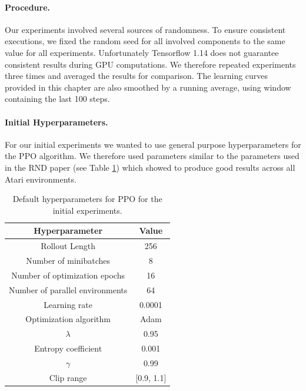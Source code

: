 \paragraph{Procedure.}
Our experiments involved several sources of randomness. To ensure consistent executions, we fixed the random seed for all involved components to the same value for all experiments. Unfortunately Tensorflow 1.14 does not guarantee consistent results during GPU computations. We therefore repeated experiments three times and averaged the results for comparison. The learning curves provided in this chapter are also smoothed by a running average, using window containing the last 100 steps.

\paragraph{Initial Hyperparameters.}
For our initial experiments we wanted to use general purpose hyperparameters for the PPO algorithm. We therefore used parameters similar to the parameters used in the RND paper \cite{burda2018exploration} (see Table \ref{tab:RNDParameters}) which showed to produce good results across all Atari environments. 


\begin{table} [ht]
    \begin{center}
        \begin{tabular}{|c|c|}
            \hline
            Hyperparameter & Value \\
            \hline
            Rollout Length & 256 \\
            Number of minibatches & 8 \\
            Number of optimization epochs & 16 \\
            Number of parallel environments & 64 \\
            Learning rate & 0.0001 \\
            Optimization algorithm & Adam \cite{kingma2014adam} \\
            $\lambda$ & 0.95 \\
            Entropy coefficient & 0.001 \\
            $\gamma$ & 0.99 \\
            Clip range & [0.9, 1.1] \\
            \hline
        \end{tabular}
    \end{center}
    \caption[Default Hyperparameters]{Default hyperparameters for PPO for the initial experiments.} \label{tab:RNDParameters}
\end{table}

